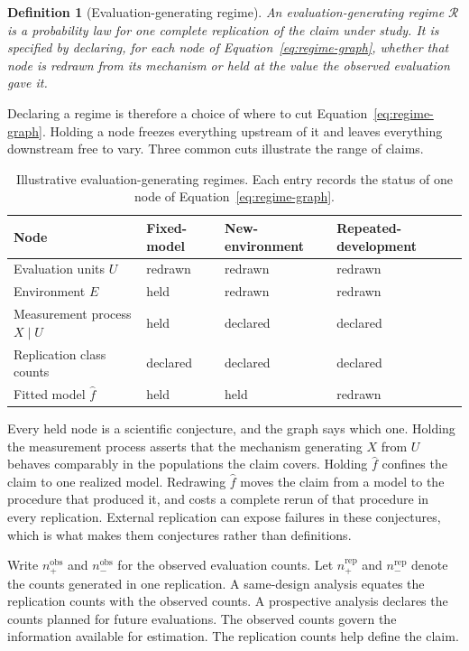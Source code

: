 \documentclass[11pt]{article}
\newcommand{\Regime}{\mathcal{R}}
\newtheorem{definition}{Definition}
\theoremstyle{remark}
\begin{document}
\begin{definition}[Evaluation-generating regime]
An evaluation-generating regime $\Regime$ is a probability law for one complete replication of the claim under study. It is specified by declaring, for each node of Equation~\eqref{eq:regime-graph}, whether that node is redrawn from its mechanism or held at the value the observed evaluation gave it.
\end{definition}

Declaring a regime is therefore a choice of where to cut Equation~\eqref{eq:regime-graph}. Holding a node freezes everything upstream of it and leaves everything downstream free to vary. Three common cuts illustrate the range of claims.

\begin{table}[ht]
\centering
\caption{Illustrative evaluation-generating regimes. Each entry records the status of one node of Equation~\eqref{eq:regime-graph}.}
\label{tab:regimes}
\begin{tabularx}{\textwidth}{@{}>{\raggedright\arraybackslash}p{}XXX@{}}
\toprule
Node & Fixed-model & New-environment & Repeated-development \\
\midrule
Evaluation units $U$ & redrawn & redrawn & redrawn \\
Environment $E$ & held & redrawn & redrawn \\
Measurement process $X\mid U$ & held & declared & declared \\
Replication class counts & declared & declared & declared \\
Fitted model $\widehat f$ & held & held & redrawn \\
\bottomrule
\end{tabularx}
\end{table}

Every held node is a scientific conjecture, and the graph says which one. Holding the measurement process asserts that the mechanism generating $X$ from $U$ behaves comparably in the populations the claim covers. Holding $\widehat f$ confines the claim to one realized model. Redrawing $\widehat f$ moves the claim from a model to the procedure that produced it, and costs a complete rerun of that procedure in every replication. External replication can expose failures in these conjectures, which is what makes them conjectures rather than definitions.

Write $n_+^{\mathrm{obs}}$ and $n_-^{\mathrm{obs}}$ for the observed evaluation counts. Let $n_+^{\mathrm{rep}}$ and $n_-^{\mathrm{rep}}$ denote the counts generated in one replication. A same-design analysis equates the replication counts with the observed counts. A prospective analysis declares the counts planned for future evaluations. The observed counts govern the information available for estimation. The replication counts help define the claim.
\end{document}
